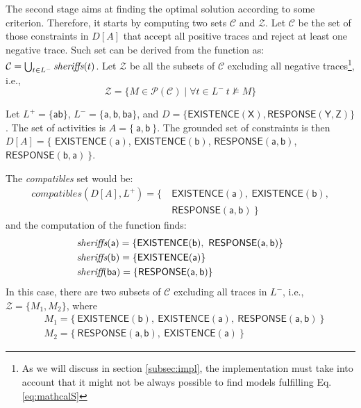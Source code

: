 The second stage aims at finding the optimal solution according to some criterion. Therefore, it starts by computing two sets $\mathcal{C}$ and $\mathcal{Z}$. 
%
Let $\mathcal{C}$ be the set of those constraints in $D[A]$ that accept all positive traces and reject at least one negative trace. Such set can be derived from the \textit{\sheriff} function as: $\mathcal{C} = \bigcup_{t\in L^-} \textit{sheriffs}(t)$.
Let $\mathcal{Z}$ be all the subsets of $\mathcal{C}$ excluding all negative traces\footnote{As we will discuss in section \ref{subsec:impl}, the implementation must take into account that it might not be always possible to find models fulfilling Eq.\ref{eq:mathcalS}}, i.e.,
\begin{equation}\label{eq:mathcalS}
\mathcal{Z}=\{M\in\mathcal{P}(\mathcal{C})\mid \forall t\in L^-~t\not\models M \} 
\end{equation}

\begin{example}
Let $L^+=\{\mathsf{ab}\}$, $L^-=\{\mathsf{a, b, ba}\}$, and $D=\{\mathsf{EXISTENCE(X)},\mathsf{RESPONSE(Y,Z)}\}$.
%
The set of activities is $A=\{\ \mathsf{a}, \mathsf{b}\ \}$.
The grounded set of constraints is then $D[A] = \{$ $\mathsf{EXISTENCE(a)}$, $\mathsf{EXISTENCE(b)}$, $\mathsf{RESPONSE(a,b)}$, $\mathsf{RESPONSE(b,a)}\ \}$.

The \textit{compatibles} set would be:
\begin{align*}
compatibles(D[A], L^+) =  \{\ & \mathsf{EXISTENCE(a)},\ \mathsf{EXISTENCE(b)},\\
&  \mathsf{RESPONSE(a,b)} \ \}	
\end{align*}
%
and the computation of the \textit{\sheriff} function finds:
\begin{subequations}
 \begin{align*}
     &\textit{sheriffs}(\mathsf{a}) =\{\mathsf{EXISTENCE(b)},\ \mathsf{RESPONSE(a,b)}\} \\
     &\textit{sheriffs}(\mathsf{b}) =\{\mathsf{EXISTENCE(a)}\} \\
     &\textit{sheriff}(\mathsf{ba})=\{\mathsf{RESPONSE(a,b)}\}
 \end{align*}
%
\end{subequations}
In this case, there are two subsets of $\mathcal{C}$ excluding all traces in $L^-$, i.e., $\mathcal{Z}=\{M_1,M_2\}$, where
\begin{subequations}
 \begin{align*}
     & M_1=\{\ \mathsf{EXISTENCE(b)},\ \mathsf{EXISTENCE(a)},\ \mathsf{RESPONSE(a,b)}\ \} \\
     & M_2=\{\ \mathsf{RESPONSE(a,b)},\ \mathsf{EXISTENCE(a)}\ \}
 \end{align*}
\end{subequations}
\end{example}


